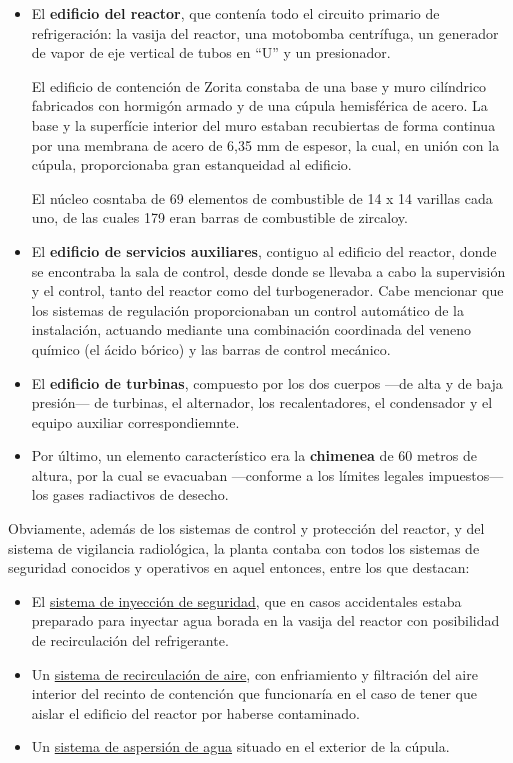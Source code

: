 \begin{itemize}
  \item El \textbf{edificio del reactor}, que contenía todo el circuito primario de refrigeración: la vasija del reactor, una motobomba centrífuga, un generador de vapor de eje vertical de tubos en ``U'' y un presionador.
  
  El edificio de contención de Zorita constaba de una base y muro cilíndrico fabricados con hormigón armado y de una cúpula hemisférica de acero. La base y la superfície interior del muro estaban recubiertas de forma continua por una membrana de acero de 6,35 mm de espesor, la cual, en unión con la cúpula, proporcionaba gran estanqueidad al edificio. 

  El núcleo cosntaba de 69 elementos de combustible de 14 x 14 varillas cada uno, de las cuales 179 eran barras de combustible de zircaloy.

  \item El \textbf{edificio de servicios auxiliares}, contiguo al edificio del reactor, donde se encontraba la sala de control, desde donde se llevaba a cabo la supervisión y el control, tanto del reactor como del turbogenerador. Cabe mencionar que los sistemas de regulación proporcionaban un control automático de la instalación, actuando mediante una combinación coordinada del veneno químico (el ácido bórico) y las barras de control mecánico.

  \item El \textbf{edificio de turbinas}, compuesto por los dos cuerpos ---de alta y de baja presión--- de turbinas,  el alternador, los recalentadores, el condensador y el equipo auxiliar correspondiemnte.
  
  \item Por último, un elemento característico era la \textbf{chimenea} de 60 metros de altura, por la cual se evacuaban ---conforme a los límites legales impuestos--- los gases radiactivos de desecho.
\end{itemize}

Obviamente, además de los sistemas de control y protección del reactor, y del sistema de vigilancia radiológica, la planta contaba con todos los sistemas de seguridad conocidos y operativos en aquel entonces, entre los que destacan:

\begin{itemize}
  \item El \underline{sistema de inyección de seguridad}, que en casos accidentales estaba preparado para inyectar agua borada en la vasija del reactor con posibilidad de recirculación del refrigerante.
  \item Un \underline{sistema de recirculación de aire}, con enfriamiento y filtración del aire interior del recinto de contención que funcionaría en el caso de tener que aislar el edificio del reactor por haberse contaminado.
  \item Un \underline{sistema de aspersión de agua} situado en el exterior de la cúpula.
\end{itemize}


